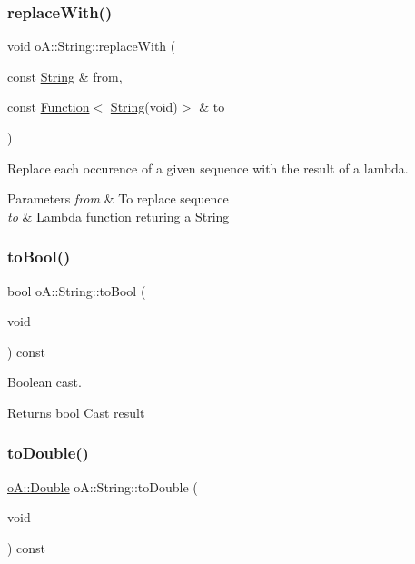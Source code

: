 \subsubsection{\texorpdfstring{replace\+With()}{replaceWith()}}
{\footnotesize\ttfamily void o\+A\+::\+String\+::replace\+With (\begin{DoxyParamCaption}\item[{const \mbox{\hyperlink{classo_a_1_1_string}{String}} \&}]{from,  }\item[{const \mbox{\hyperlink{namespaceo_a_a85bea86b9d05d2b86c77d8ee5b7bbde5}{Function}}$<$ \mbox{\hyperlink{classo_a_1_1_string}{String}}(void)$>$ \&}]{to }\end{DoxyParamCaption})}



Replace each occurence of a given sequence with the result of a lambda. 


\begin{DoxyParams}{Parameters}
{\em from} & To replace sequence \\
\hline
{\em to} & Lambda function returing a \mbox{\hyperlink{classo_a_1_1_string}{String}} \\
\hline
\end{DoxyParams}
\mbox{\label{classo_a_1_1_string_a838537de7617a227e77662090f25d5a9}} 
\subsubsection{\texorpdfstring{to\+Bool()}{toBool()}}
{\footnotesize\ttfamily bool o\+A\+::\+String\+::to\+Bool (\begin{DoxyParamCaption}\item[{void}]{ }\end{DoxyParamCaption}) const}



Boolean cast. 

\begin{DoxyReturn}{Returns}
bool Cast result 
\end{DoxyReturn}
\mbox{\label{classo_a_1_1_string_a609bc93f4fdb26cc79d26747741af787}} 
\subsubsection{\texorpdfstring{to\+Double()}{toDouble()}}
{\footnotesize\ttfamily \mbox{\hyperlink{namespaceo_a_a2bcc976232176d2dcf8b9df1fa33c038}{o\+A\+::\+Double}} o\+A\+::\+String\+::to\+Double (\begin{DoxyParamCaption}\item[{void}]{ }\end{DoxyParamCaption}) const}



